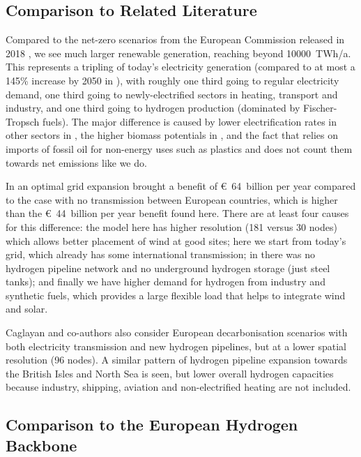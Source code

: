 \subsection*{Comparison to Related Literature}

Compared to the net-zero scenarios from the European Commission released in 2018
\cite{in-depth_2018}, we see much larger renewable generation, reaching beyond
10000~TWh/a. This represents a tripling
of today's electricity generation (compared to at most a 145\% increase by 2050
in \cite{in-depth_2018}), with roughly one third going to regular electricity
demand, one third going to newly-electrified sectors in heating, transport and
industry, and one third going to hydrogen production (dominated by
Fischer-Tropsch fuels). The major difference is caused by lower electrification
rates in other sectors in \cite{in-depth_2018}, the higher biomass potentials in
\cite{in-depth_2018}, and the fact that \cite{in-depth_2018} relies on imports
of fossil oil for non-energy uses such as plastics and does not count them
towards net emissions like we do.

In \cite{brownSynergiesSector2018} an optimal grid expansion brought a benefit
of \euro~64~billion per year compared to the case with no transmission between
European countries, which is higher than the \euro~44~billion per year benefit
found here. There are at least four causes for this difference: the model here
has higher resolution (181 versus 30 nodes) which allows better placement of
wind at good sites; here we start from today's grid, which already has some
international transmission; in \cite{brownSynergiesSector2018} there was no
hydrogen pipeline network and no underground hydrogen storage (just steel
tanks); and finally we have higher demand for hydrogen from industry and
synthetic fuels, which provides a large flexible load that helps to integrate
wind and solar.

Caglayan and co-authors \cite{Caglayan2019} also consider European
decarbonisation scenarios with both electricity transmission and new hydrogen
pipelines, but at a lower spatial resolution (96 nodes). A similar pattern of
hydrogen pipeline expansion towards the British Isles and North Sea is seen, but
lower overall hydrogen capacities because industry, shipping, aviation and
non-electrified heating are not included.

\subsection*{Comparison to the European Hydrogen Backbone}


